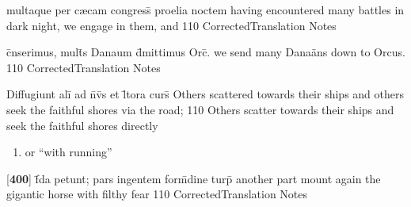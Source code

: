 \latline
  {multaque per c{\ae}cam congress\={\macron {\i}} proelia noctem}
  {having encountered many battles in dark night, we engage in them, and }
  {110}
  { CorrectedTranslation }
  { Notes }


\latline
  {c\={}nserimus, mult\={}s Danaum d\={}mittimus Orc\={}.}
  { we send many Dana\"ans down to Orcus. }
  {110}
  { CorrectedTranslation }
  { Notes }


\latline
  {Diffugiunt ali\={\macron {\i}} ad n\={}v\={\macron {\i}}s et l\={\macron {\i}}tora curs\={}}
  { Others scattered towards their ships and others seek the faithful shores via the road;  }
  {110}
  { Others scatter towards their ships and seek the faithful shores directly }
  { \begin{enumerate}
  	\item or ``with running''
  \end{enumerate} }


\latline
  {[\textbf{400}] f\={\macron {\i}}da petunt; pars ingentem form\={\macron {\i}}dine turp\={\macron {\i}}}
  { another part mount again the gigantic horse with filthy fear  }
  {110}
  { CorrectedTranslation }
  { Notes }


